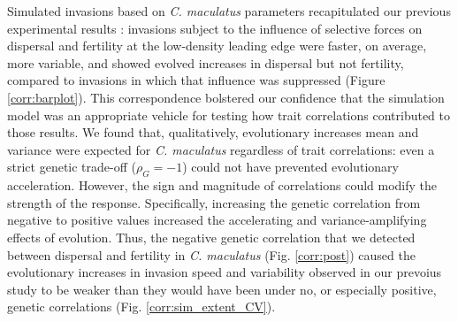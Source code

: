 \documentclass[11pt]{article}
\newcommand{\revise}[1]{{\color{Mahogany}{#1}}}
\begin{document}
Simulated invasions based on \textit{C. maculatus} parameters recapitulated our previous experimental results \citep{ochocki_rapid_2017}: invasions subject to the influence of selective forces on dispersal and fertility at the low-density leading edge were faster, on average, more variable, and showed evolved increases in dispersal but not fertility, compared to invasions in which that influence was suppressed (Figure \ref{corr:barplot}).
This correspondence bolstered our confidence that the simulation model was an appropriate vehicle for testing how trait correlations contributed to those results.
We found that, qualitatively, evolutionary increases \revise{in} mean and variance were expected for \textit{C. maculatus} regardless of trait correlations: even a strict genetic trade-off ($\rho_{G} = -1$) could not have prevented evolutionary acceleration.
However, the sign and magnitude of correlations could modify the strength of the response.
Specifically, increasing the genetic correlation from negative to positive values increased the accelerating and variance-amplifying effects of evolution.
Thus, the negative genetic correlation that we detected between dispersal and fertility in \textit{C. maculatus} (Fig. \ref{corr:post}) caused the evolutionary increases in invasion speed and variability observed in our prevoius study to be weaker than they would have been under no, or especially positive, genetic correlations (Fig. \ref{corr:sim_extent_CV}).
\end{document}
